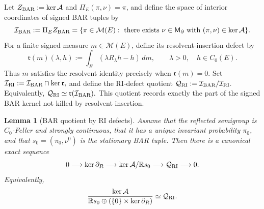 \documentclass[aihp]{imsart}
\numberwithin{equation}{section}
\theoremstyle{plain}
\newtheorem{lemma}[lemma]{Lemma}
\theoremstyle{definition}
\newcommand{\cM}{\mathcal M}
\newcommand{\1}{\mathbf 1}
\begin{document}
Let $Z_{\rm BAR}:=\ker\mathcal A$ and $\Pi_E(\pi,\nu)=\pi$, and define the space of interior coordinates of signed BAR tuples by
\begin{equation}\label{eq:unified-I-BAR}
 \mathcal I_{\rm BAR}:=\Pi_E Z_{\rm BAR}
 =\{\pi\in\cM(E):\text{ there exists }\nu\in\mathsf M_\partial
       \text{ with }(\pi,\nu)\in\ker\mathcal A\}.
\end{equation}
For a finite signed measure $m\in\cM(E)$, define its resolvent-insertion defect by
\begin{equation}\label{eq:unified-r-defect}
 \mathfrak r(m)(\lambda,h)
 :=\int_E(\lambda R_\lambda h-h)\,dm,
 \qquad \lambda>0,\quad h\in C_0(E).
\end{equation}
Thus $m$ satisfies the resolvent identity precisely when $\mathfrak r(m)=0$.  Set $\mathcal I_{\rm RI}:=\mathcal I_{\rm BAR}\cap\ker\mathfrak r,
$ and define the RI-defect quotient $ \mathcal Q_{\rm RI}:=\mathcal I_{\rm BAR}/\mathcal I_{\rm RI}.
$ Equivalently, $ \mathcal Q_{\rm RI}\simeq \mathfrak r(\mathcal I_{\rm BAR}).
$ This quotient records exactly the part of the signed BAR kernel not killed by resolvent insertion.

\begin{lemma}[BAR quotient by RI defects]\label{lem:RI-defect-quotient}
Assume that the reflected semigroup is $C_0$-Feller and strongly continuous, that it has a unique invariant probability $\pi_0$, and that $s_0=(\pi_0,\nu^0)$ is the stationary BAR tuple.  Then there is a canonical exact sequence
\begin{equation}\label{eq:unified-exact-sequence}
 0
 \longrightarrow
 \ker\partial_R
 \longrightarrow
 \ker\mathcal A/\mathbb R s_0
 \longrightarrow
 \mathcal Q_{\rm RI}
 \longrightarrow
 0.
\end{equation}
Equivalently,
\begin{equation}\label{eq:unified-quotient-isomorphism}
 \frac{\ker\mathcal A}
 {\mathbb R s_0\oplus(\{0\}\times\ker\partial_R)}
 \simeq
 \mathcal Q_{\rm RI}.
\end{equation}
\end{lemma}
\end{document}
